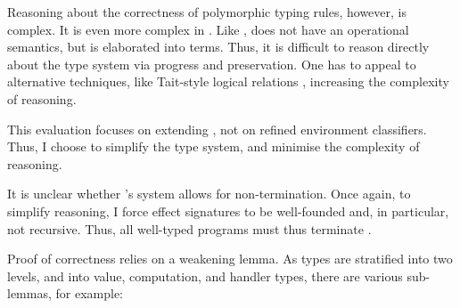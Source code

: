 Reasoning about the correctness of polymorphic typing rules, however, is complex. It is even more complex in \recLang{}. Like \sourceLang{}, \recLang{} does not have an operational semantics, but is elaborated into \recCoreLang{} terms. Thus, it is difficult to reason directly about the \recLang{} type system via progress and preservation. One has to appeal to alternative techniques, like Tait-style logical relations \citep{tait-67}, increasing the complexity of reasoning.

This evaluation focuses on extending \calculusName{}, not on refined environment classifiers. Thus, I choose to simplify the type system, and minimise the complexity of reasoning. 

It is unclear whether \citeauthor{isoda-24}'s system allows for non-termination. Once again, to simplify reasoning, I force effect signatures to be well-founded and, in particular, not recursive. Thus, all well-typed programs must thus terminate \citep{kammar-2013}. 

Proof of correctness relies on a weakening lemma. As types are stratified into two levels, and into value, computation, and handler types, there are various sub-lemmas, for example:

\newcommand{\rcqtypejudge}[4][\Gamma]{{#1} \vdash_{\compilemode \mid \quotemode}^{#2} {#3} : {#4}}
\newcommand{\rctypejudge}[4][\Gamma]{{#1} \vdash_{\compilemode}^{#2} {#3} : {#4}}
\newcommand{\rqtypejudge}[4][\Gamma]{{#1} \vdash_{\quotemode}^{#2} {#3}: {#4}}
\newcommand{\rstypejudge}[3][\Gamma]{{#1} \vdash_{\splicemode} {#2} : {#3}}

